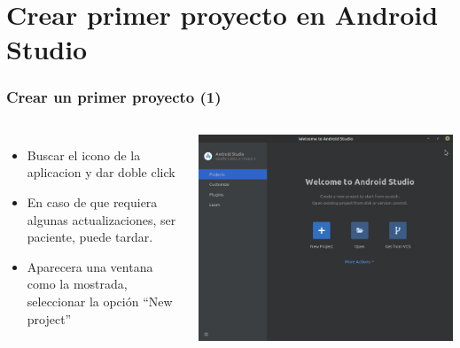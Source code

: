 
\section{Crear primer proyecto en Android Studio}

\begin{frame}
\frametitle{Crear un primer proyecto (1)}  
\begin{columns}
\begin{itemize}
\item Buscar el icono de la aplicacion y dar doble click
\item En caso de que requiera algunas actualizaciones, ser paciente, puede tardar.
\item Aparecera una ventana como la mostrada, seleccionar la opci\'on ``New project''
\end{itemize}
\begin{center}
\includegraphics[width=0.95\linewidth]{00_PasosParaConfigurarSmartphoneModoDesarrollador/AndroidStudio01.png}    
\end{center}
\end{columns}
\end{frame}

